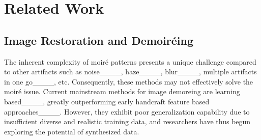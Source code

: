 \section{Related Work}
\label{sec:related-work} 

\subsection{Image Restoration and Demoiréing}
The inherent complexity of moiré patterns presents a unique challenge compared to other artifacts such as noise____, haze____, blur____, multiple artifacts in one go____, etc. Consequently, these methods may not effectively solve the moiré issue. Current mainstream methods for image demoreing are learning based____, greatly outperforming early handcraft feature based approaches____. However, they exhibit poor generalization capability due to insufficient diverse and realistic training data, and researchers have thus begun exploring the potential of synthesized data.


